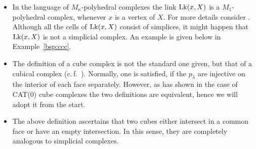 \begin{rem}
  \label{rem:complex}
  \begin{itemize}
  \item In the language of \(M_\kappa\)-polyhedral complexes the link \(\operatorname{Lk}(x, X)\) is a \(M_1\)-polyhedral complex, whenever \(x\) is a vertex of \(X\). For more details consider \textcite[Section~I.7]{MR1744486}. Although all the cells of \(\operatorname{Lk}(x,X)\) consist of simplices, it might happen that \(\operatorname{Lk}(x,X)\) is not a simplicial complex. An example is given below in Example~\ref{bsp:ccc}.
  \item The definition of a cube complex is not the standard one given, but that of a cubical complex (c.\,f.~\cite[Def.~I.7.37]{MR1744486}). Normally, one is satisfied, if the \(p_\lambda\) are injective on the interior of each face separately. However, as \textcite[Thm.~C.4]{MR3029427} has shown in the case of CAT(0) cube complexes the two definitions are equivalent, hence we will adopt it from the start.
  \item The above definition ascertains that two cubes either intersect in a common face or have an empty intersection. In this sense, they are completely analogous to simplicial complexes. 
  \end{itemize}
\end{rem}





  
